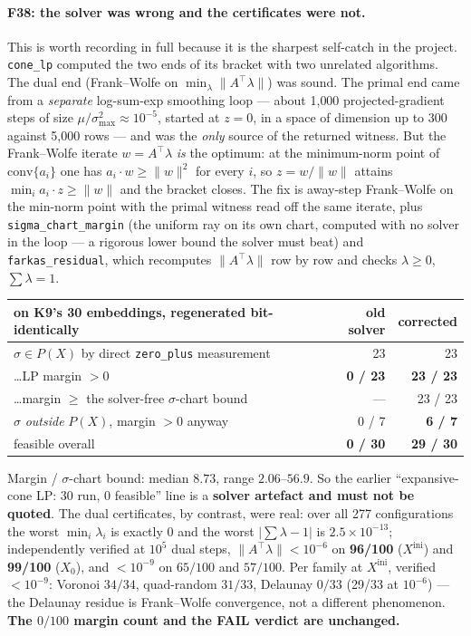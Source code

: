 \documentclass[11pt,a4paper]{article}
\theoremstyle{definition}
\newcommand{\file}[1]{\texttt{\small #1}}
\begin{document}
\paragraph{F38: the solver was wrong and the certificates were not.} This is worth recording
in full because it is the sharpest self-catch in the project. \file{cone\_lp} computed the two
ends of its bracket with two unrelated algorithms. The dual end (Frank--Wolfe on
$\min_\lambda\|A^{\!\top}\lambda\|$) was sound. The primal end came from a \emph{separate}
log-sum-exp smoothing loop --- about 1{,}000 projected-gradient steps of size
$\mu/\sigma_{\max}^2\approx10^{-5}$, started at $z=0$, in a space of dimension up to 300
against 5{,}000 rows --- and was the \emph{only} source of the returned witness. But the
Frank--Wolfe iterate $w=A^{\!\top}\lambda$ \emph{is} the optimum: at the minimum-norm point of
$\mathrm{conv}\{a_i\}$ one has $a_i\!\cdot\!w\ge\|w\|^2$ for every $i$, so $z=w/\|w\|$ attains
$\min_i a_i\!\cdot\!z\ge\|w\|$ and the bracket closes. The fix is away-step Frank--Wolfe on
the min-norm point with the primal witness read off the same iterate, plus
\file{sigma\_chart\_margin} (the uniform ray on its own chart, computed with no solver in the
loop --- a rigorous lower bound the solver must beat) and \file{farkas\_residual}, which
recomputes $\|A^{\!\top}\lambda\|$ row by row and checks $\lambda\ge0$, $\sum\lambda=1$.

\begin{center}
\small
\begin{tabular}{@{}lrr@{}}
\toprule
on K9's 30 embeddings, regenerated bit-identically & old solver & corrected \\
\midrule
$\sigma\in P(X)$ by direct \file{zero\_plus} measurement & 23 & 23 \\
\quad \dots LP margin $>0$ & \textbf{0 / 23} & \textbf{23 / 23} \\
\quad \dots margin $\ge$ the solver-free $\sigma$-chart bound & --- & 23 / 23 \\
$\sigma$ \emph{outside} $P(X)$, margin $>0$ anyway & 0 / 7 & \textbf{6 / 7} \\
feasible overall & \textbf{0 / 30} & \textbf{29 / 30} \\
\bottomrule
\end{tabular}
\end{center}

\noindent Margin / $\sigma$-chart bound: median $\mathbf{8.73}$, range $2.06$--$56.9$. So the
earlier ``expansive-cone LP: 30 run, 0 feasible'' line is a \textbf{solver artefact and must
not be quoted}. The dual certificates, by contrast, were real: over all 277 configurations
the worst $\min_i\lambda_i$ is exactly $0$ and the worst $|\sum\lambda-1|$ is
$2.5\times10^{-13}$; independently verified at $10^5$ dual steps, $\|A^{\!\top}\lambda\|<10^{-6}$
on \textbf{96/100} ($X^{\mathrm{ini}}$) and \textbf{99/100} ($X_0$), and $<10^{-9}$ on
$65/100$ and $57/100$. Per family at $X^{\mathrm{ini}}$, verified $<10^{-9}$: Voronoi
$34/34$, quad-random $31/33$, Delaunay $0/33$ (29/33 at $10^{-6}$) --- the Delaunay residue is
Frank--Wolfe convergence, not a different phenomenon. \textbf{The $0/100$ margin count and the
FAIL verdict are unchanged.}
\end{document}
